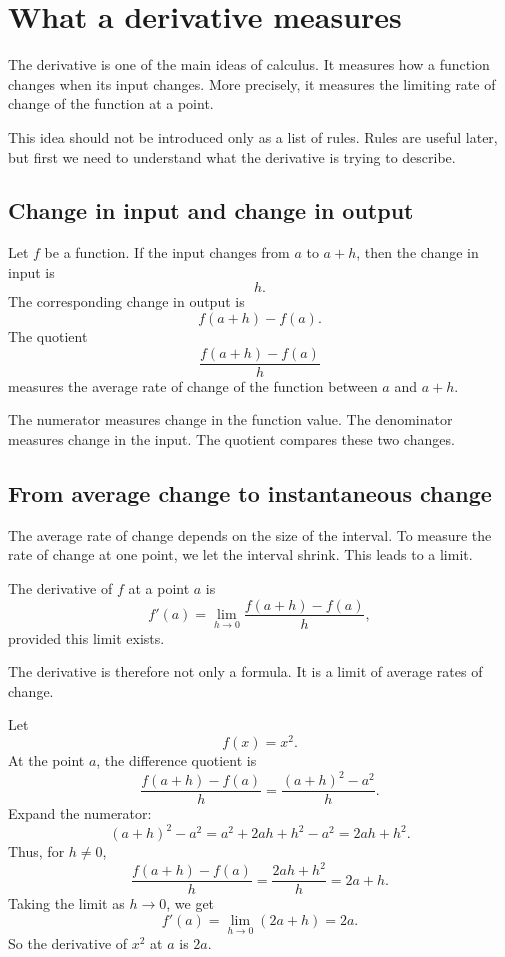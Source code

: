 \section{What a derivative measures}

The derivative is one of the main ideas of calculus. It measures how a function changes when its input changes. More precisely, it measures the limiting rate of change of the function at a point.

This idea should not be introduced only as a list of rules. Rules are useful later, but first we need to understand what the derivative is trying to describe.

\subsection*{Change in input and change in output}

Let \(f\) be a function. If the input changes from \(a\) to \(a+h\), then the change in input is
\[
h.
\]
The corresponding change in output is
\[
f(a+h)-f(a).
\]
The quotient
\[
\frac{f(a+h)-f(a)}{h}
\]
measures the average rate of change of the function between \(a\) and \(a+h\).

\begin{remarkbox}
The numerator measures change in the function value. The denominator measures change in the input. The quotient compares these two changes.
\end{remarkbox}

\subsection*{From average change to instantaneous change}

The average rate of change depends on the size of the interval. To measure the rate of change at one point, we let the interval shrink. This leads to a limit.

\begin{definitionbox}
The derivative of \(f\) at a point \(a\) is
\[
f'(a)=\lim_{h\to0}\frac{f(a+h)-f(a)}{h},
\]
provided this limit exists.
\end{definitionbox}

The derivative is therefore not only a formula. It is a limit of average rates of change.

\begin{examplebox}
Let
\[
f(x)=x^2.
\]
At the point \(a\), the difference quotient is
\[
\frac{f(a+h)-f(a)}{h}
=
\frac{(a+h)^2-a^2}{h}.
\]
Expand the numerator:
\[
(a+h)^2-a^2=a^2+2ah+h^2-a^2=2ah+h^2.
\]
Thus, for \(h\ne0\),
\[
\frac{f(a+h)-f(a)}{h}=\frac{2ah+h^2}{h}=2a+h.
\]
Taking the limit as \(h\to0\), we get
\[
f'(a)=\lim_{h\to0}(2a+h)=2a.
\]
So the derivative of \(x^2\) at \(a\) is \(2a\).
\end{examplebox}

